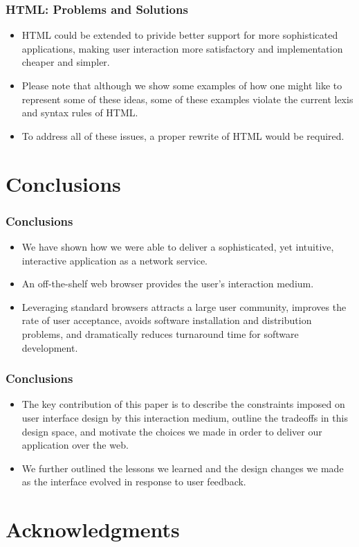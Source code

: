 \documentclass{beamer}
\begin{document}
\begin{frame}
\frametitle{HTML: Problems and Solutions}

\begin{itemize}
\item HTML could be extended to privide better support for more sophisticated applications, making user interaction more satisfactory and implementation cheaper and simpler.
\item Please note that although we show some examples of how one might like to represent some of these ideas, some of these examples violate the current lexis and syntax rules of HTML.
\item To address all of these issues, a proper rewrite of HTML would be required.
\end{itemize}

\end{frame}

\section[Conclusions]{Conclusions}


\begin{frame}
\frametitle{Conclusions}

\begin{itemize}
\item We have shown how we were able to deliver a sophisticated, yet intuitive, interactive application as a network service.
\item An off-the-shelf web browser provides the user's interaction medium.
\item Leveraging standard browsers attracts a large user community, improves the rate of user acceptance, avoids software installation and distribution problems, and dramatically reduces turnaround time for software development.
\end{itemize}

\end{frame}

\begin{frame}
\frametitle{Conclusions}

\begin{itemize}
\item The key contribution of this paper is to describe the constraints imposed on user interface design by this interaction medium, outline the tradeoffs in this design space, and motivate the choices we made in order to deliver our application over the web.
\item We further outlined the lessons we learned and the design changes we made as the interface evolved in response to user feedback.
\end{itemize}

\end{frame}

\section[Acknowledgments]{Acknowledgments}
\end{document}
